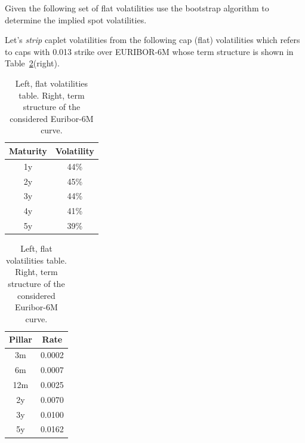 \documentclass[12pt,a4paper]{article}
\begin{document}
\begin{question}
Given the following set of flat volatilities use the bootstrap algorithm to determine the implied spot volatilities.

Let's \emph{strip} caplet volatilities from the following cap (flat) volatilities which refers to caps with 0.013 strike over EURIBOR-6M whose term structure is shown in Table~\ref{tab:flat_volatilities}(right).

\begin{table}[htpb]
\begin{center}
\renewcommand{\arraystretch}{2}
\begin{tabular}{|c|c|}
\hline
Maturity & Volatility \\ \hline
1y & 44\% \\ \hline
2y & 45\% \\ \hline
3y & 44\% \\ \hline
4y & 41\% \\ \hline
5y & 39\% \\ \hline
\end{tabular}
\quad
\begin{tabular}{|c|c|}
\hline
Pillar & Rate \\ \hline
3m & 0.0002 \\ \hline
6m & 0.0007 \\ \hline
12m & 0.0025 \\ \hline
2y  & 0.0070 \\ \hline
3y & 0.0100 \\ \hline
5y & 0.0162 \\ \hline
\end{tabular}
\end{center}
\label{tab:flat_volatilities}
\caption{Left, flat volatilities table. Right, term structure of the considered Euribor-6M curve.}
\end{table}


\end{question}
\end{document}

